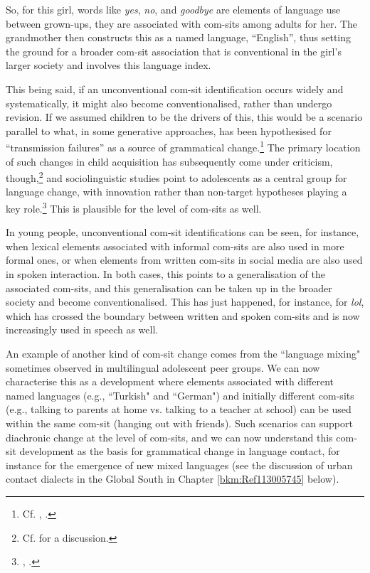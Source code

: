 So, for this girl, words like \textit{yes}, \textit{no}, and \textit{goodbye} are elements of language use between grown-ups, they are associated with com-sits among adults for her. The grandmother then constructs this as a named language, “English”, thus setting the ground for a broader com-sit association that is conventional in the girl’s larger society and involves this language index.

This being said, if an unconventional com-sit identification occurs widely and systematically, it might also become conventionalised, rather than undergo revision. If we assumed children to be the drivers of this, this would be a scenario parallel to what, in some generative approaches, has been hypothesised for “transmission failures” as a source of grammatical change.\footnote{Cf. \citet{Lightfoot1991}, \citet{Kroch2001}.} The primary location of such changes in child acquisition has subsequently come under criticism, though,\footnote{Cf. \citet{Meisel2011} for a discussion.} and sociolinguistic studies point to adolescents as a central group for language change, with innovation rather than non-target hypotheses playing a key role.\footnote{\citet{Eckert2000}, \citet{Tagliamonte2016}.} This is plausible for the level of com-sits as well.

In young people, unconventional com-sit identifications can be seen, for instance, when lexical elements associated with informal com-sits are also used in more formal ones, or when elements from written com-sits in social media are also used in spoken interaction. In both cases, this points to a generalisation of the associated com-sits, and this generalisation can be taken up in the broader society and become conventionalised. This has just happened, for instance, for \textit{lol}, which has crossed the boundary between written and spoken com-sits and is now increasingly used in speech as well.

An example of another kind of com-sit change comes from the “language mixing" sometimes observed in multilingual adolescent peer groups. We can now characterise this as a development where elements associated with different named languages (e.g., “Turkish" and “German") and initially different com-sits (e.g., talking to parents at home vs. talking to a teacher at school) can be used within the same com-sit (hanging out with friends). Such scenarios can support diachronic change at the level of com-sits, and we can now understand this com-sit development as the basis for grammatical change in language contact, for instance for the emergence of new mixed languages (see the discussion of urban contact dialects in the Global South in Chapter \ref{bkm:Ref113005745} below).

